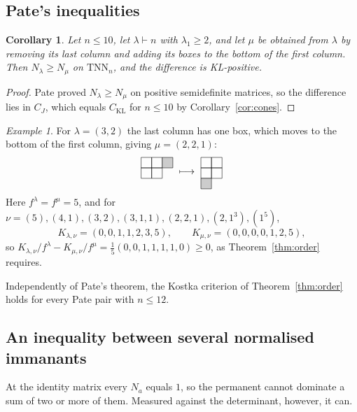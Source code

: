 \documentclass[11pt]{amsart}
\newtheorem{corollary}[theorem]{Corollary}
\theoremstyle{definition}
\theoremstyle{remark}
\newtheorem{exa}{Example}[section]
\newcommand{\TNN}{\mathrm{TNN}}
\newcommand{\CKL}{C_{\mathrm{KL}}}
\newcommand{\CJ}{C_{J}}
\begin{document}
\subsection{Pate's inequalities}
\begin{corollary}\label{cor:pate}
Let $n\le10$, let $\lambda\vdash n$ with $\lambda_1\ge2$, and let $\mu$ be obtained from $\lambda$ by removing its last column and adding its boxes to the bottom of the first column. Then $N_\lambda\ge N_\mu$ on $\TNN_n$, and the difference is KL-positive.
\end{corollary}

\begin{proof}
Pate \cite{Pat91} proved $N_\lambda\ge N_\mu$ on positive semidefinite matrices, so the difference lies in $\CJ$, which equals $\CKL$ for $n\le10$ by Corollary~\ref{cor:cones}.
\end{proof}

\begin{exa}\label{exa:pate}
For $\lambda=(3,2)$ the last column has one box, which moves to the bottom of the first column, giving $\mu=(2,2,1)$:
\[
\begin{tikzpicture}[scale=0.38,baseline=(c.base)]
  \foreach \x/\y in {0/0,1/0,0/-1,1/-1} \draw (\x,\y) rectangle ++(1,1);
  \fill[gray!40] (2,0) rectangle ++(1,1); \draw (2,0) rectangle ++(1,1);
  \node (c) at (1.5,-0.6) {};
\end{tikzpicture}
\ \longmapsto\
\begin{tikzpicture}[scale=0.38,baseline=(c.base)]
  \foreach \x/\y in {0/0,1/0,0/-1,1/-1} \draw (\x,\y) rectangle ++(1,1);
  \fill[gray!40] (0,-2) rectangle ++(1,1); \draw (0,-2) rectangle ++(1,1);
  \node (c) at (1,-0.6) {};
\end{tikzpicture}
\]
Here $f^\lambda=f^\mu=5$, and for $\nu=(5),(4,1),(3,2),(3,1,1),(2,2,1),(2,1^3),(1^5)$,
\[
K_{\lambda,\nu}=(0,0,1,1,2,3,5),\qquad K_{\mu,\nu}=(0,0,0,0,1,2,5),
\]
so $K_{\lambda,\nu}/f^\lambda-K_{\mu,\nu}/f^\mu=\frac15(0,0,1,1,1,1,0)\ge0$, as Theorem~\ref{thm:order} requires.
\end{exa}

Independently of Pate's theorem, the Kostka criterion of Theorem~\ref{thm:order} holds for every Pate pair with $n\le12$.

\subsection{An inequality between several normalised immanants}
At the identity matrix every $N_a$ equals $1$, so the permanent cannot dominate a sum of two or more of them. Measured against the determinant, however, it can.
\end{document}
